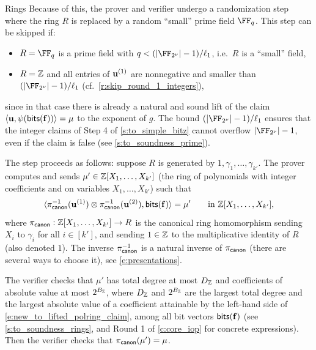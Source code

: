\begin{lncsmove}{Rings}
 Because of this, the prover and verifier undergo a randomization step where the ring $R$ is replaced by a random ``small'' prime field $\FF_q$. This step can be skipped if:
 \begin{itemize}[leftmargin=*]
     \item $R=\FF_q$ is a prime field with $q<\fieldboundsizeexponent$, i.e.\ $R$ is a ``small'' field,
     \item $R=\mathbb{Z}$ and all entries of $\mathbf{u}^{(1)}$ are nonnegative and smaller than $\fieldboundsizeexponent$ (cf.\ \cref{r:skip_round_1_integers}),
 \end{itemize}
since in that case there is already a natural and sound lift of the claim $\langle \mathbf{u}, \psi(\mathsf{bits}(\mathbf{f}))\rangle =\mu$ to the exponent of $g$. The bound $\fieldboundsizeexponent$ ensures that the integer claims of Step 4 of \cref{s:to_simple_bitz} cannot overflow $|\comfield|-1$, even if the claim is false (see \cref{s:to_soundness_prime}).

\bigskip 

\noindent The step proceeds as follows: 
suppose $R$ is generated by $1, \gamma_1, \ldots, \gamma_{k'}$. The prover computes and sends $\mu' \in \mathbb{Z}[X_1, \ldots, X_{k'}]$ (the ring of polynomials with integer coefficients and on variables $X_1,\ldots, X_{k'}$) such that
%
\begin{equation}\label{e:new_to_lifted_polring_claim}
\langle \pi_{\mathsf{canon}}^{-1}(\mathbf{u}^{(1)}) \otimes \pi_{\mathsf{canon}}^{-1}(\mathbf{u}^{(2)}) , \mathsf{bits}(\mathbf{f}) \rangle = \mu' \qquad \text{in } \mathbb{Z}[X_1, \ldots, X_{k'}],
\end{equation}
where $\pi_{\mathsf{canon}}: \mathbb{Z}[X_1, \ldots, X_{k'}] \to R$ is the canonical ring homomorphism sending $X_i$ to $\gamma_i$ for all $i\in [k']$, and sending $1\in \mathbb{Z}$ to the multiplicative identity of $R$ (also denoted $1$). The inverse $\pi_{\mathsf{canon}}^{-1}$ is a natural inverse of $\pi_{\mathsf{canon}}$ (there are several ways to choose it), see \cref{e:presentations}.



%
The verifier checks that $\mu'$ has total degree at most $D_{\mathbb{Z}}$ and coefficients of absolute value at most $2^{B_{\mathbb{Z}}}$, where $D_{\mathbb{Z}}$ and $2^{B_{\mathbb{Z}}}$ are the largest total degree and the largest absolute value of a coefficient attainable by the left-hand side of \eqref{e:new_to_lifted_polring_claim}, among all bit vectors $\mathsf{bits}(\mathbf{f})$ (see \cref{s:to_soundness_rings}, and Round 1 of \cref{c:core_iop} for concrete expressions).  Then the verifier checks that $\pi_{\mathsf{canon}}(\mu')=\mu$.




\end{lncsmove}
